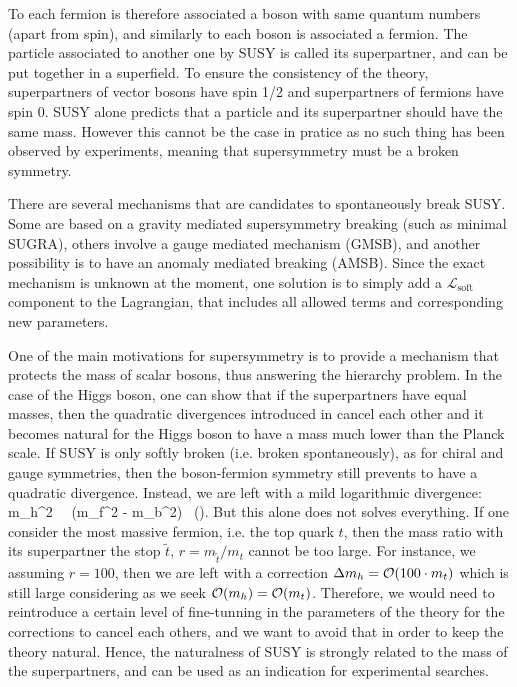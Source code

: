         To each fermion is therefore associated a boson with same quantum numbers (apart
        from spin), and similarly to each boson
        is associated a fermion. The particle associated to another one by SUSY is called
        its superpartner, and can be put together in a superfield. To ensure the consistency
        of the theory, superpartners of vector bosons have spin 1/2 and superpartners
        of fermions have spin 0. SUSY alone predicts that a particle and its superpartner
        should have the same mass. However this cannot be the case in pratice as no
        such thing has been observed by experiments, meaning that supersymmetry must be
        a broken symmetry.

        There are several mechanisms that are candidates to spontaneously break SUSY. Some
        are based on a gravity mediated supersymmetry breaking (such as minimal SUGRA),
        others involve a gauge mediated mechanism (GMSB), and another possibility is to
        have an anomaly mediated breaking (AMSB). Since the exact mechanism is unknown at
        the moment, one solution is to simply add a $\mathcal{L}_\text{soft}$ component to
        the Lagrangian, that includes all allowed terms and corresponding new parameters.

        One of the main motivations for supersymmetry is to provide a mechanism that
        protects the mass of scalar bosons, thus answering the hierarchy problem. In the
        case of the Higgs boson, one can show
        that if the superpartners have equal masses, then the quadratic divergences
        introduced in  cancel each other and
        it becomes natural for the Higgs boson to have a mass much lower than the Planck scale.
        If SUSY is only softly broken (i.e. broken spontaneously), as for chiral and gauge
        symmetries, then the boson-fermion symmetry still prevents to have a quadratic
        divergence. Instead, we are left with a mild logarithmic divergence:
        {
            \Delta m_h^2 \, \propto \, (m_f^2 - m_b^2) \, \left(\right).
        }
        But this alone does not solves everything. If one consider the most massive
        fermion, i.e. the top quark $t$, then the mass ratio with its superpartner the
        stop $\tilde{t}$, $r = m_{\tilde{t}} / m_t$ cannot be too large. For instance,
        we assuming $r = 100$, then we are left with a correction $\Delta m_h = \mathcal{O}(100 \cdot m_t)$
        which is still large considering as we seek $\mathcal{O}(m_h) = \mathcal{O}(m_t)$.
        Therefore, we would need to reintroduce a certain level of fine-tunning in the
        parameters of the theory for the corrections to cancel each others, and we want
        to avoid that in order to keep the theory natural. Hence, the naturalness of SUSY
        is strongly related to the mass of the superpartners, and can be used as an indication
        for experimental searches.

